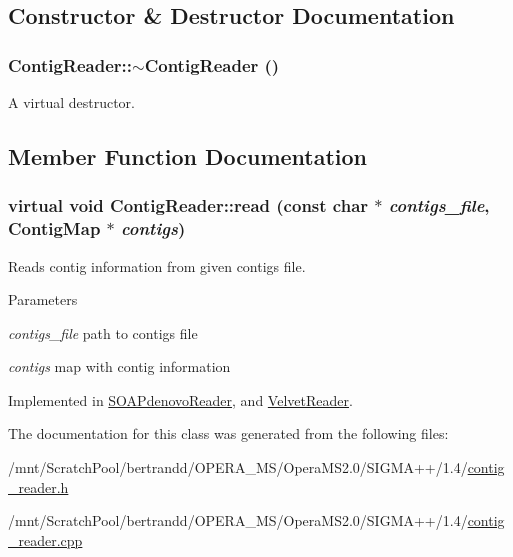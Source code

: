 \subsection{Constructor \& Destructor Documentation}
\hypertarget{classContigReader_a26db06ba9c6316bfee92a5f5b19cf3d4}{
\subsubsection[{$\sim$ContigReader}]{\setlength{\rightskip}{0pt plus 5cm}ContigReader::$\sim$ContigReader ()}}
\label{classContigReader_a26db06ba9c6316bfee92a5f5b19cf3d4}
A virtual destructor. 

\subsection{Member Function Documentation}
\hypertarget{classContigReader_a935b5918388b7009b36e639391cfa4e8}{
\subsubsection[{read}]{\setlength{\rightskip}{0pt plus 5cm}virtual void ContigReader::read (const char $\ast$ {\em contigs\_\-file}, \/  {\bf ContigMap} $\ast$ {\em contigs})}}
\label{classContigReader_a935b5918388b7009b36e639391cfa4e8}


Reads contig information from given contigs file. 
\begin{DoxyParams}{Parameters}
\item[{\em contigs\_\-file}]path to contigs file \item[{\em contigs}]map with contig information \end{DoxyParams}


Implemented in \hyperlink{classSOAPdenovoReader_a308a9eb5c0b557c98705eaa4bd6626f7}{SOAPdenovoReader}, and \hyperlink{classVelvetReader_a0121c85cb0fefcc3f0c52f134756ed2e}{VelvetReader}.

The documentation for this class was generated from the following files:\begin{DoxyCompactItemize}
\item 
/mnt/ScratchPool/bertrandd/OPERA\_\-MS/OperaMS2.0/SIGMA++/1.4/\hyperlink{contig__reader_8h}{contig\_\-reader.h}\item 
/mnt/ScratchPool/bertrandd/OPERA\_\-MS/OperaMS2.0/SIGMA++/1.4/\hyperlink{contig__reader_8cpp}{contig\_\-reader.cpp}\end{DoxyCompactItemize}
